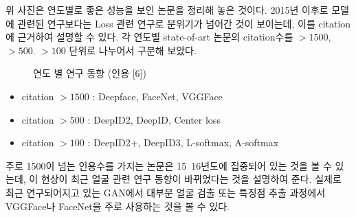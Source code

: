 \documentclass{oblivoir}
\begin{document}
위 사진은 연도별로 좋은 성능을 보인 논문을 정리해 놓은 것이다. 2015년 이후로 모델에 관련된 연구보다는 Loss 관련 연구로 분위기가 넘어간 것이 보이는데, 이를 citation에 근거하여 설명할 수 있다. 각 연도별 state-of-art 논문의 citation수를 $>1500$, $> 500$. $> 100$ 단위로 나누어서 구분해 보았다. 

\begin{figure}[h!]
\centering
\caption{연도 별 연구 동향 (인용 [6])}
\end{figure}

\begin{itemize}
\item   citation $> 1500$ : Deepface, FaceNet, VGGFace
\item   citation $> 500$  : DeepID2, DeepID, Center loss
\item   citation $> 100$  : DeepID2+, DeepID3, L-softmax, A-softmax
\end{itemize}

주로 1500이 넘는 인용수를 가지는 논문은 15~16년도에 집중되어 있는 것을 볼 수 있는데, 이 현상이 최근 얼굴 관련 연구 동향이 바뀌었다는 것을 설명하여 준다. 실제로 최근 연구되어지고 있는 GAN에서 대부분 얼굴 검출 또는 특징점 추출 과정에서 VGGFace나 FaceNet을 주로 사용하는 것을 볼 수 있다. 
\end{document}
